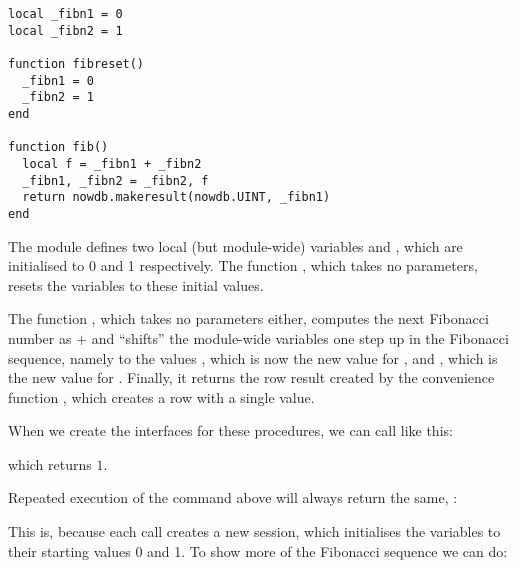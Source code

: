 \begin{lua}
\begin{lstlisting}
local _fibn1 = 0
local _fibn2 = 1

function fibreset()
  _fibn1 = 0
  _fibn2 = 1
end

function fib()
  local f = _fibn1 + _fibn2
  _fibn1, _fibn2 = _fibn2, f
  return nowdb.makeresult(nowdb.UINT, _fibn1)
end
\end{lstlisting}
\end{lua}

The module defines two local (but module-wide)
variables  and ,
which are initialised to 0 and 1 respectively.
The function , which takes no
parameters, resets the variables to these
initial values.

The function , which takes no parameters either,
computes the next Fibonacci number as
 $+$  and
``shifts'' the module-wide variables one step
up in the Fibonacci sequence, namely to
the values , which is now
the new value for , and ,
which is the new value for .
Finally, it returns the row result created by
the convenience function ,
which creates a row with a single value.

When we create the interfaces for these procedures,
we can call  like this:


which returns $1$.

Repeated execution of the command above will always return the same, \eg:


This is, because each call creates a new session, which
initialises the variables to their starting values 0 and 1.
To show more of the Fibonacci sequence we can do:


